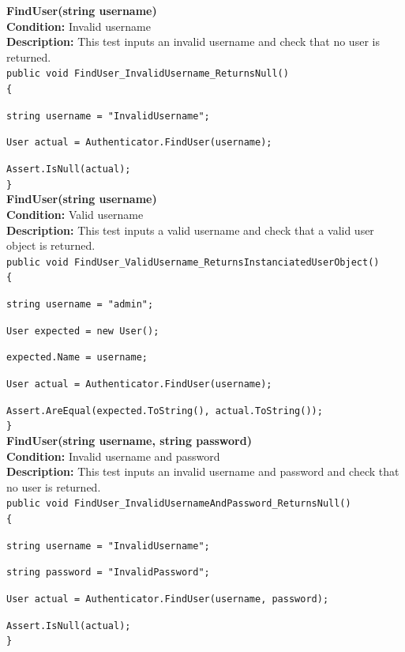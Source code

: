 \documentclass[12pt]{article}
\begin{document}
{\bfseries FindUser(string username)}\\
{\bfseries Condition:} Invalid username\\
{\bfseries Description:} This test inputs an invalid username and check that no user is returned.\\
\clearpage
\texttt{public void FindUser\_InvalidUsername\_ReturnsNull()}\\
\texttt{\{}\par
\texttt{string username = "InvalidUsername";}\par
\texttt{User actual = Authenticator.FindUser(username);}\par
\texttt{Assert.IsNull(actual);}\\
\texttt{\}}\\



{\bfseries FindUser(string username)}\\
{\bfseries Condition:} Valid username\\
{\bfseries Description:} This test inputs a valid username and check that a valid user object is returned.\\
\texttt{public void FindUser\_ValidUsername\_ReturnsInstanciatedUserObject()}\\
\texttt{\{}\par
\texttt{string username = "admin";}\par
\texttt{User expected = new User();}\par
\texttt{expected.Name = username;}\par  	 
\texttt{User actual = Authenticator.FindUser(username);}\par
\texttt{Assert.AreEqual(expected.ToString(), actual.ToString());}\\
\texttt{\}}\\

{\bfseries FindUser(string username, string password)}\\
{\bfseries Condition:} Invalid username and password\\
{\bfseries Description:} This test inputs an invalid username and password and check that no user is returned.\\
\texttt{public void FindUser\_InvalidUsernameAndPassword\_ReturnsNull()}\\
\texttt{\{}\par
\texttt{string username = "InvalidUsername";}\par
\texttt{string password = "InvalidPassword";}\par
\texttt{User actual = Authenticator.FindUser(username, password);}\par
\texttt{Assert.IsNull(actual);}\\
\texttt{\}}\\
\end{document}
